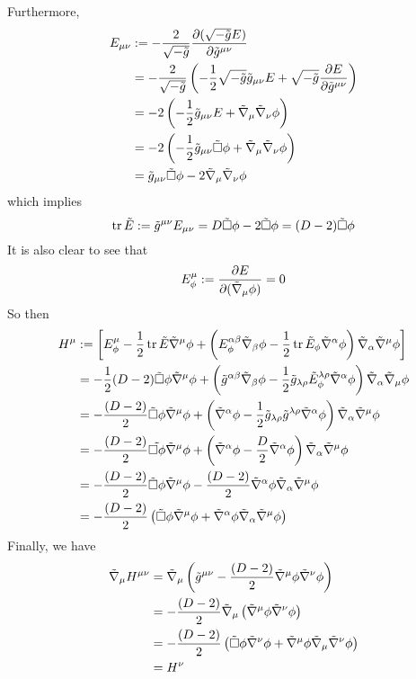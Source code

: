 Furthermore,
\begin{align}
  E_{\mu\nu }&:=-\frac{2}{\sqrt{-\tilde{g}}}\pdv{(\sqrt{-\tilde{g}}E)}{\tilde{g}^{\mu\nu}}\\
  &=-\frac{2}{\sqrt{-\tilde{g}}}\left(-\frac{1}{2}\sqrt{-\tilde{g}}\tilde{g}_{\mu\nu }E+\sqrt{-\tilde{g}}\pdv{E}{\tilde{g}^{\mu\nu}}\right)\\
  &=-2\left(-\frac{1}{2}\tilde{g}_{\mu\nu }E+\tilde{\nabla}_\mu\tilde{\nabla}_\nu\phi \right)\\
  &=-2\left(-\frac{1}{2}\tilde{g}_{\mu\nu }\tilde{\Box }\phi +\tilde{\nabla}_\mu\tilde{\nabla}_\nu\phi \right)\\
  &=\tilde{g}_{\mu\nu }\tilde{\Box }\phi-2\tilde{\nabla}_\mu\tilde{\nabla}_\nu\phi 
\end{align}
which implies
\begin{equation}
  \tr\tilde{E}:=\tilde{g}^{\mu\nu }E_{\mu\nu }=D\tilde{\Box}\phi-2\tilde{\Box }\phi=(D-2)\tilde{\Box}\phi 
\end{equation}
It is also clear to see that
\begin{equation}
  E^\mu_\phi :=\pdv{E}{(\tilde{\nabla}_\mu\phi)}=0
\end{equation}
So then
\begin{align}
  H^\mu &:=\left[E^\mu_\phi -\frac{1}{2}\tr\tilde{E}\tilde{\nabla}^\mu\phi +\left(E^{\alpha\beta }_\phi\tilde{\nabla}_\beta \phi -\frac{1}{2}\tr \tilde{E}_\phi\tilde{\nabla}^\alpha\phi \right)\tilde{\nabla}_\alpha\tilde{\nabla}^\mu\phi \right]\\
  &=-\frac{1}{2}(D-2)\tilde{\Box}\phi\tilde{\nabla}^\mu\phi+\left(\tilde{g}^{\alpha\beta }\tilde{\nabla}_\beta\phi -\frac{1}{2}\tilde{g}_{\lambda\rho }\tilde{E}^{\lambda\rho }_\phi \tilde{\nabla}^\alpha\phi \right)\tilde{\nabla}_\alpha\tilde{\nabla}_\mu\phi \\
  &=-\frac{(D-2)}{2}\tilde{\Box }\phi\tilde{\nabla}^\mu\phi +\left(\tilde{\nabla}^\alpha\phi-\frac{1}{2}\tilde{g}_{\lambda\rho }\tilde{g}^{\lambda\rho }\tilde{\nabla}^{\alpha}\phi \right)\tilde{\nabla}_\alpha\tilde{\nabla}^\mu\phi \\
  &=-\frac{(D-2)}{2}\tilde{\Box\phi }\tilde{\nabla}^\mu \phi +\left(\tilde{\nabla}^{\alpha }\phi-\frac{D}{2}\tilde{\nabla}^{\alpha }\phi \right)\tilde{\nabla}_\alpha\tilde{\nabla}^\mu\phi \\\
  &=-\frac{(D-2)}{2}\tilde{\Box}\phi \tilde{\nabla}^\mu\phi -\frac{(D-2)}{2}\tilde{\nabla}^{\alpha }\phi\tilde{\nabla}_\alpha\tilde{\nabla}^\mu\phi \\
  &=-\frac{(D-2)}{2}\left(\tilde{\Box}\phi\tilde{\nabla}^\mu\phi +\tilde{\nabla}^{\alpha }\phi\tilde{\nabla}_\alpha\tilde{\nabla}^\mu \phi \right)
\end{align}
Finally, we have
\begin{align}
  \tilde{\nabla}_\mu H^{\mu\nu }&=\tilde{\nabla}_\mu\left( \tilde{g}^{\mu\nu }-\frac{(D-2)}{2}\tilde{\nabla}^\mu\phi\tilde{\nabla}^\nu\phi \right)\\
  &=-\frac{(D-2)}{2}\tilde{\nabla}_\mu \left(\tilde{\nabla}^\mu\phi\tilde{\nabla}^\nu \phi \right)\\
  &=-\frac{(D-2)}{2}\left(\tilde{\Box}\phi \tilde{\nabla}^\nu\phi+\tilde{\nabla}^\mu\phi\tilde{\nabla}_\mu\tilde{\nabla}^\nu\phi \right)\\
  &=H^\nu 
\end{align}

